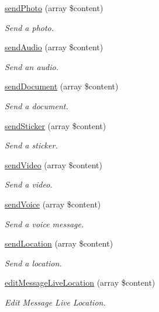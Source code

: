 \begin{DoxyCompactItemize}
\hyperlink{class_telegram_ac7adcbd9f46b77664f8b738b84f290e7}{send\-Photo} (array \$content)
\begin{DoxyCompactList}\small\item\em Send a photo. \end{DoxyCompactList}\item 
\hyperlink{class_telegram_a178b081bbab51f83caa31e554b3e2ffe}{send\-Audio} (array \$content)
\begin{DoxyCompactList}\small\item\em Send an audio. \end{DoxyCompactList}\item 
\hyperlink{class_telegram_a25569ca763bd149891d86b89bc66cf54}{send\-Document} (array \$content)
\begin{DoxyCompactList}\small\item\em Send a document. \end{DoxyCompactList}\item 
\hyperlink{class_telegram_a0a176d232d8e7941184698447902beb6}{send\-Sticker} (array \$content)
\begin{DoxyCompactList}\small\item\em Send a sticker. \end{DoxyCompactList}\item 
\hyperlink{class_telegram_a789f27ed21d8a1232cc60832efdab17f}{send\-Video} (array \$content)
\begin{DoxyCompactList}\small\item\em Send a video. \end{DoxyCompactList}\item 
\hyperlink{class_telegram_a4faab9f92639453b851912d41ca1a3ca}{send\-Voice} (array \$content)
\begin{DoxyCompactList}\small\item\em Send a voice message. \end{DoxyCompactList}\item 
\hyperlink{class_telegram_ac395e843f13d36d70f57c2d26868a33f}{send\-Location} (array \$content)
\begin{DoxyCompactList}\small\item\em Send a location. \end{DoxyCompactList}\item 
\hyperlink{class_telegram_a38c3b4e1043d9a4e831c30c258f5e7ee}{edit\-Message\-Live\-Location} (array \$content)
\begin{DoxyCompactList}\small\item\em Edit Message Live Location. \end{DoxyCompactList}\item 

\end{DoxyCompactItemize}
